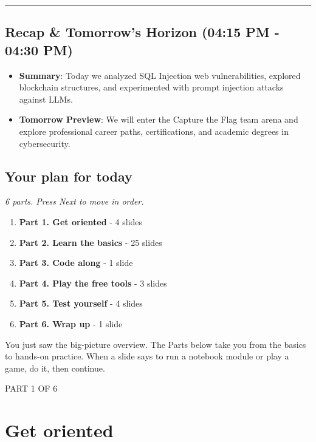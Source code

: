 \documentclass[12pt,openany]{book}
\begin{document}
\medskip\noindent\rule{\linewidth}{0.4pt}\medskip

\medskip

\subsection*{Recap \& Tomorrow's Horizon (04:15 PM - 04:30 PM)}


\begin{itemize}

  \item \textbf{Summary}: Today we analyzed SQL Injection web vulnerabilities, explored blockchain structures, and experimented with prompt injection attacks against LLMs.

  \item \textbf{Tomorrow Preview}: We will enter the Capture the Flag team arena and explore professional career paths, certifications, and academic degrees in cybersecurity.

\end{itemize}

\medskip

\subsection*{Your plan for today}
{\small\itshape\color{gray}6 parts. Press Next to move in order.}


\begin{enumerate}
  \item \textbf{Part 1. Get oriented} - 4 slides
  \item \textbf{Part 2. Learn the basics} - 25 slides
  \item \textbf{Part 3. Code along} - 1 slide
  \item \textbf{Part 4. Play the free tools} - 3 slides
  \item \textbf{Part 5. Test yourself} - 4 slides
  \item \textbf{Part 6. Wrap up} - 1 slide
\end{enumerate}

You just saw the big-picture overview. The Parts below take you from the basics to hands-on practice. When a slide says to run a notebook module or play a game, do it, then continue.

\medskip

\vspace{4pt}\noindent\textsc{PART 1 OF 6}


\section*{Get oriented}
\end{document}
